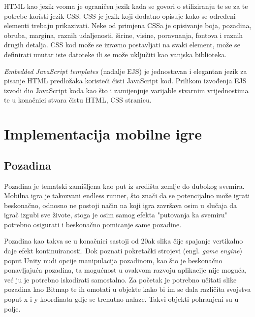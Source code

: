 \documentclass[times, utf8, zavrsni, numeric]{fer}
\begin{document}
	HTML kao jezik veoma je ograničen jezik kada se govori o stiliziranju te se za te potrebe koristi jezik CSS. CSS je jezik koji dodatno opisuje kako se određeni elementi trebaju prikazivati. Neke od primjena CSSa je opisivanje boja, pozadina, obruba,
	margina, raznih udaljenosti, širine, visine, poravnanja, fontova i raznih drugih detalja. CSS kod može se izravno postavljati na svaki element, može se definirati unutar iste datoteke ili se može uključiti kao vanjska biblioteka. 
	
	\textit{Embedded JavaScript templates} (nadalje EJS)\cite{ejs} je jednostavan i elegantan jezik za pisanje HTML predložaka koristeći čisti JavaScript kod. Prilikom izvođenja EJS izvodi dio JavaScript koda kao što i zamijenjuje varijable stvarnim vrijednostima te
	u konačnici stvara čistu HTML, CSS stranicu.
	

	

\chapter{Implementacija mobilne igre}

	\section{Pozadina}
	Pozadina je tematski zamišljena kao put iz središta zemlje  do dubokog svemira. Mobilna igra je takozvani endless runner, što znači da se potencijalno može igrati beskonačno,
	odnosno ne postoji način na koji igra završava osim u slučaja da igrač izgubi sve živote, stoga je osim samog efekta "putovanja ka svemiru" potrebno osigurati i beskonačno pomicanje same pozadine.
	
	Pozadina kao takva se u konačnici sastoji od 20ak slika čije spajanje vertikalno daje efekt kontinuiranosti. Dok poznati pokretački strojevi (engl. \textit{game engine}) poput Unity nudi opcije manipulacija
	pozadinom, kao što je beskonačno ponavljajuća pozadina, ta mogućnost u ovakvom razvoju aplikacije nije moguća, već ju je potrebno iskodirati samostalno. 
	Za početak je potrebno učitati slike pozadina kao Bitmap te ih omotati u objekte kako bi im se dala različita svojstva poput x i y koordinata gdje se trenutno nalaze. Takvi objekti pohranjeni su u polje.
	
\end{document}
